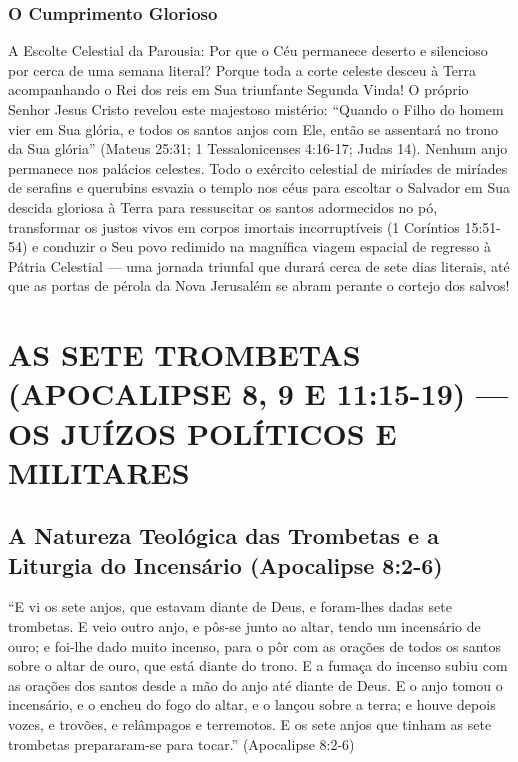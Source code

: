 \subsubsection*{O Cumprimento Glorioso}
A Escolte Celestial da Parousia:
Por que o Céu permanece deserto e silencioso por cerca de uma semana literal?
Porque toda a corte celeste desceu à Terra acompanhando o Rei dos reis em Sua triunfante Segunda Vinda!
O próprio Senhor Jesus Cristo revelou este majestoso mistério: ``Quando o Filho do homem vier em Sua glória, e todos os santos anjos com Ele, então se assentará no trono da Sua glória'' (Mateus 25:31; 1 Tessalonicenses 4:16-17; Judas 14). Nenhum anjo permanece nos palácios celestes. Todo o exército celestial de miríades de miríades de serafins e querubins esvazia o templo nos céus para escoltar o Salvador em Sua descida gloriosa à Terra para ressuscitar os santos adormecidos no pó, transformar os justos vivos em corpos imortais incorruptíveis (1 Coríntios 15:51-54) e conduzir o Seu povo redimido na magnífica viagem espacial de regresso à Pátria Celestial — uma jornada triunfal que durará cerca de sete dias literais, até que as portas de pérola da Nova Jerusalém se abram perante o cortejo dos salvos!


\section{AS SETE TROMBETAS (APOCALIPSE 8, 9 E 11:15-19) — OS JUÍZOS POLÍTICOS E MILITARES}



\subsection{A Natureza Teológica das Trombetas e a Liturgia do Incensário (Apocalipse 8:2-6)}


``E vi os sete anjos, que estavam diante de Deus, e foram-lhes dadas sete trombetas. E veio outro anjo, e pôs-se junto ao altar, tendo um incensário de ouro; e foi-lhe dado muito incenso, para o pôr com as orações de todos os santos sobre o altar de ouro, que está diante do trono. E a fumaça do incenso subiu com as orações dos santos desde a mão do anjo até diante de Deus. E o anjo tomou o incensário, e o encheu do fogo do altar, e o lançou sobre a terra; e houve depois vozes, e trovões, e relâmpagos e terremotos. E os sete anjos que tinham as sete trombetas prepararam-se para tocar.'' (Apocalipse 8:2-6)


